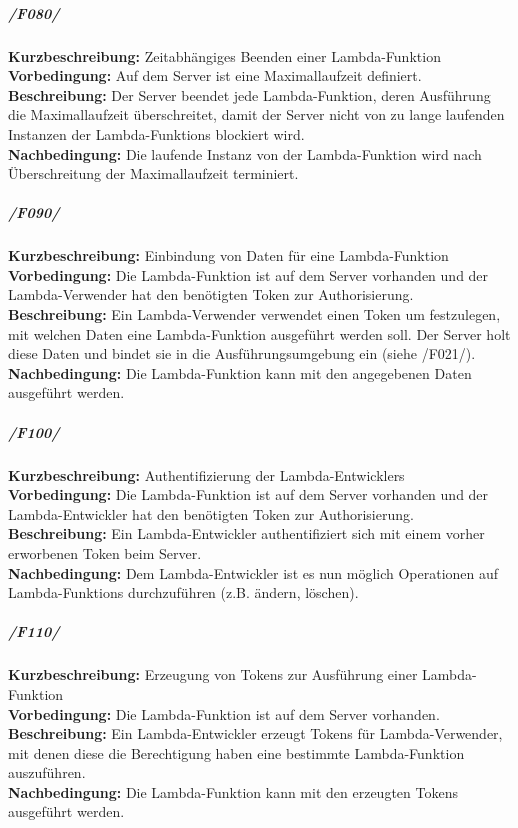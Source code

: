 \documentclass[a4paper,20pt,oneside]{book}
\begin{document}
\subparagraph{/F080/}
\textbf{Kurzbeschreibung:} Zeitabhängiges Beenden einer \Gls{Lambda-Funktion}
\\
\textbf{Vorbedingung:} Auf dem \Gls{Server} ist eine Maximallaufzeit definiert.
\\
\textbf{Beschreibung:} Der \Gls{Server} beendet jede \Gls{Lambda-Funktion}, deren Ausführung die Maximallaufzeit überschreitet, damit der \Gls{Server} nicht von zu lange laufenden Instanzen der \glspl{Lambda-Funktion} blockiert wird. 
\\
\textbf{Nachbedingung:} Die laufende Instanz von der \Gls{Lambda-Funktion} wird nach Überschreitung der Maximallaufzeit terminiert.

\subparagraph{/F090/}
\textbf{Kurzbeschreibung:} Einbindung von Daten für eine \Gls{Lambda-Funktion}
\\
\textbf{Vorbedingung:} Die \Gls{Lambda-Funktion} ist auf dem \Gls{Server} vorhanden und der \Gls{Lambda-Verwender} hat den benötigten \Gls{Token} zur Authorisierung.
\\
\textbf{Beschreibung:} Ein \Gls{Lambda-Verwender} verwendet einen \Gls{Token} um festzulegen, mit welchen Daten eine \Gls{Lambda-Funktion} ausgeführt werden soll. Der \Gls{Server} holt diese Daten und bindet sie in die Ausführungsumgebung ein (siehe /F021/).
\\
\textbf{Nachbedingung:} Die \Gls{Lambda-Funktion} kann mit den angegebenen Daten ausgeführt werden.

\subparagraph{/F100/}
\textbf{Kurzbeschreibung:} Authentifizierung der \Glspl{Lambda-Entwickler}
\\
\textbf{Vorbedingung:} Die \Gls{Lambda-Funktion} ist auf dem \Gls{Server} vorhanden und der \Gls{Lambda-Entwickler} hat den benötigten \Gls{Token} zur Authorisierung.
\\
\textbf{Beschreibung:} Ein \Gls{Lambda-Entwickler} authentifiziert sich mit einem vorher erworbenen \Gls{Token} beim \Gls{Server}.
\\
\textbf{Nachbedingung:} Dem \Gls{Lambda-Entwickler} ist es nun möglich Operationen auf \Glspl{Lambda-Funktion} durchzuführen (z.B. ändern, löschen).

\pagebreak

\subparagraph{/F110/}
\textbf{Kurzbeschreibung:} Erzeugung von \Glspl{Token} zur Ausführung einer \Gls{Lambda-Funktion}
\\
\textbf{Vorbedingung:} Die \Gls{Lambda-Funktion} ist auf dem \Gls{Server} vorhanden.
\\
\textbf{Beschreibung:} Ein \Gls{Lambda-Entwickler} erzeugt \Glspl{Token} für \Gls{Lambda-Verwender}, mit denen diese die Berechtigung haben eine bestimmte \Gls{Lambda-Funktion} auszuführen.
\\
\textbf{Nachbedingung:} Die \Gls{Lambda-Funktion} kann mit den erzeugten \Glspl{Token} ausgeführt werden.
\\
\end{document}
